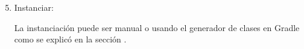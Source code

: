 			

\begin{enumerate}
  \setcounter{enumi}{4}
	\item Instanciar:

	La instanciación puede ser manual o usando el generador de clases en Gradle como se explicó en la sección \cite{sec:instanciacion}.

\end{enumerate}	





